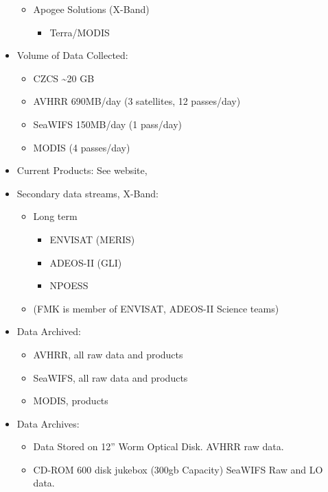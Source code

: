 \begin{itemize}
\begin{itemize}
  \item Apogee Solutions (X-Band)
    \begin{itemize}
    \item Terra/MODIS
    \end{itemize}
  \end{itemize}


\item Volume of Data Collected:
  \begin{itemize}
  \item CZCS  \~{}20 GB
  \item AVHRR  690MB/day
    (3 satellites, 12 passes/day)
  \item SeaWIFS 150MB/day
    (1 pass/day)
  \item MODIS
    (4 passes/day)
  \end{itemize}

\item Current Products:
  See website, 


\item Secondary data streams, X-Band:
  \begin{itemize}
  \item Long term
    \begin{itemize}
    \item ENVISAT (MERIS)
    \item ADEOS-II (GLI)
    \item NPOESS
    \end{itemize}
  \item (FMK is member of ENVISAT, ADEOS-II Science teams)
  \end{itemize}

\item Data Archived:
  \begin{itemize}
  \item AVHRR, all raw data and products
  \item SeaWIFS, all raw data and products
  \item MODIS, products
  \end{itemize}


\item Data Archives:
  \begin{itemize}
  \item Data Stored on 12'' Worm Optical Disk.
    AVHRR raw data.
  \item CD-ROM 600 disk jukebox (300gb Capacity)
    SeaWIFS Raw and LO data.
  \end{itemize}


\end{itemize}

